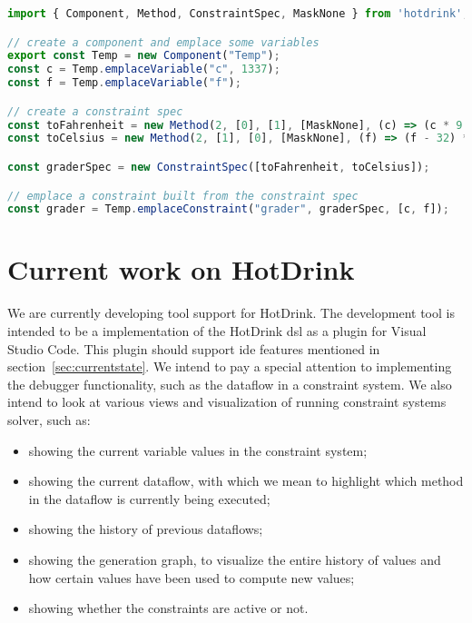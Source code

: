 \begin{lstlisting}[caption={Example of how to use the HotDrink \gls{api} to simulate the corranltion between fahrenheit and celsius},label=hotdrinkapi, language=JavaScript]
import { Component, Method, ConstraintSpec, MaskNone } from 'hotdrink';

// create a component and emplace some variables
export const Temp = new Component("Temp");
const c = Temp.emplaceVariable("c", 1337);
const f = Temp.emplaceVariable("f");

// create a constraint spec
const toFahrenheit = new Method(2, [0], [1], [MaskNone], (c) => (c * 9 / 5 + 32));
const toCelsius = new Method(2, [1], [0], [MaskNone], (f) => (f - 32) * 5 / 9);

const graderSpec = new ConstraintSpec([toFahrenheit, toCelsius]);

// emplace a constraint built from the constraint spec
const grader = Temp.emplaceConstraint("grader", graderSpec, [c, f]);
\end{lstlisting}

\section{Current work on HotDrink}
We are currently developing tool support for HotDrink. The development tool is intended 
to be a implementation of the HotDrink \gls{dsl} as a plugin for Visual Studio Code. 
This plugin should support \gls{ide} features mentioned in section~\ref{sec:currentstate}. 
We intend to pay a special attention to implementing the debugger functionality, such as 
the dataflow in a constraint system. We also intend to look at various views and 
visualization of running constraint systems solver, such as: 
\begin{itemize}
    \item showing the current variable values in the constraint system;
    \item showing the current dataflow, with which we mean to highlight which method in the dataflow is currently being executed;
    \item showing the history of previous dataflows;
    \item showing the generation graph, to visualize the entire history of values and how certain values have been used to compute new values;
    \item showing whether the constraints are active or not.
\end{itemize}